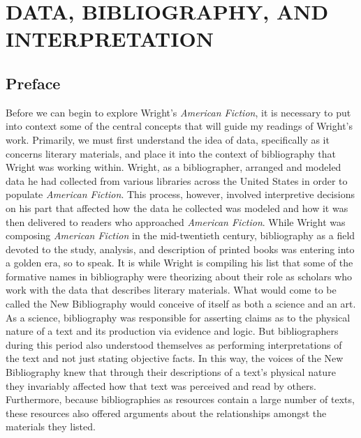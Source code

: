 %
%
%
%



\chapter{DATA, BIBLIOGRAPHY, AND INTERPRETATION}
\section{Preface}

Before we can begin to explore Wright's \textit{American Fiction}, it is necessary to put into context some of the central concepts that will guide my readings of Wright's work. Primarily, we must first understand the idea of data, specifically as it concerns literary materials, and place it into the context of bibliography that Wright was working within. Wright, as a bibliographer, arranged and modeled data he had collected from various libraries across the United States in order to populate \textit{American Fiction}. This process, however, involved interpretive decisions on his part that affected how the data he collected was modeled and how it was then delivered to readers who approached \textit{American Fiction}. While Wright was composing \textit{American Fiction} in the mid-twentieth century, bibliography as a field devoted to the study, analysis, and description of printed books was entering into a golden era, so to speak. It is while Wright is compiling his list that some of the formative names in bibliography were theorizing about their role as scholars who work with the data that describes literary materials. What would come to be called the New Bibliography would conceive of itself as both a science and an art. As a science, bibliography was responsible for asserting claims as to the physical nature of a text and its production via evidence and logic. But bibliographers during this period also understood themselves as performing interpretations of the text and not just stating objective facts. In this way, the voices of the New Bibliography knew that through their descriptions of a text's physical nature they invariably affected how that text was perceived and read by others. Furthermore, because bibliographies as resources contain a large number of texts, these resources also offered arguments about the relationships amongst the materials they listed.

